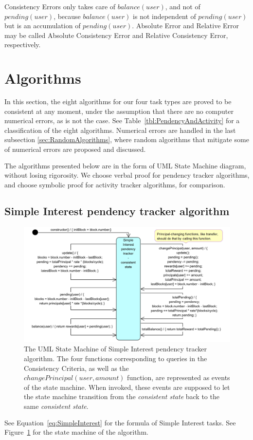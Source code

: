 \documentclass{article}
\begin{document}
  Consistency Errors only takes care of $balance(user)$, and not of $pending(user)$, 
  because $balance(user)$ is not independent of $pending(user)$ but is an accumulation of 
  $pending(user)$. Absolute Error and Relative Error may be called Absolute Consistency Error 
  and Relative Consistency Error, respectively.

\section{Algorithms}
\label{sec:Algorithms}

In this section, the eight algorithms for our four task types are proved 
to be consistent at any moment, under the assumption that there are no 
computer numerical errors, as is not the case.
See Table~\ref{tbl:PendencyAndActivity} 
for a classification of the eight algorithms.
Numerical errors are handled in the last 
subsection \ref{sec:RandomAlgorithms}, where random 
algorithms that mitigate some of numerical errors are proposed and discussed.

The algorithms presented below are in the form of UML 
State Machine diagram, without losing rigorosity. 
We choose verbal proof for pendency tracker algorithms,
and choose symbolic proof for activity tracker algorithms, for comparison.

\subsection{Simple Interest pendency tracker algorithm}
\label{sec:SimpleInterestPendency}

\begin{figure}[H]
  \centering
  \includegraphics[width=5.3in]{images/SimpleInterestPendency.jpg}
  \caption{The UML State Machine of Simple Interest pendency tracker algorithm. 
  The four functions corresponding to queries in the Consistency Criteria,  
  as well as the $changePrincipal(user,amount)$ function, are represented  
  as events of the state machine.
  When invoked, these events are supposed to let the state machine transition 
  from the \textit{consistent state} back to the same \textit{consistent state}.
  }
  \label{fig:SimpleInterestPendency}
\end{figure}
See Equation~\ref{eq:SimpleInterest} for the formula of Simple Interest tasks.
See Figure~\ref{fig:SimpleInterestPendency} for the state machine of the algorithm.
\end{document}
